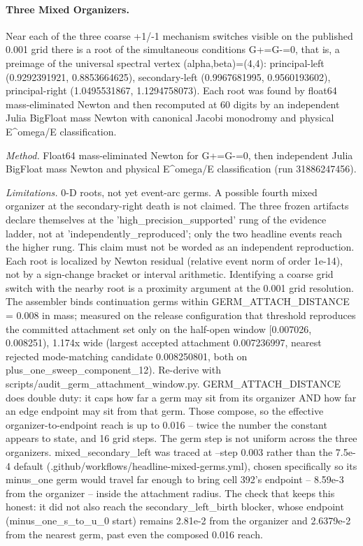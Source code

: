 \paragraph{Three Mixed Organizers.}
Near each of the three coarse +1/-1 mechanism switches visible on the published 0.001 grid there is a root of the simultaneous conditions G+=G-=0, that is, a preimage of the universal spectral vertex (alpha,beta)=(4,4): principal-left (0.9292391921, 0.8853664625), secondary-left (0.9967681995, 0.9560193602), principal-right (1.0495531867, 1.1294758073). Each root was found by float64 mass-eliminated Newton and then recomputed at 60 digits by an independent Julia BigFloat mass Newton with canonical Jacobi monodromy and physical E\^{}omega/E classification.

\emph{Method.} Float64 mass-eliminated Newton for G+=G-=0, then independent Julia BigFloat mass Newton and physical E\^{}omega/E classification (run 31886247456).

\emph{Limitations.} 0-D roots, not yet event-arc germs. A possible fourth mixed organizer at the secondary-right death is not claimed. The three frozen artifacts declare themselves at the 'high\_precision\_supported' rung of the evidence ladder, not at 'independently\_reproduced'; only the two headline events reach the higher rung. This claim must not be worded as an independent reproduction. Each root is localized by Newton residual (relative event norm of order 1e-14), not by a sign-change bracket or interval arithmetic. Identifying a coarse grid switch with the nearby root is a proximity argument at the 0.001 grid resolution. The assembler binds continuation germs within GERM\_ATTACH\_DISTANCE = 0.008 in mass; measured on the release configuration that threshold reproduces the committed attachment set only on the half-open window [0.007026, 0.008251), 1.174x wide (largest accepted attachment 0.007236997, nearest rejected mode-matching candidate 0.008250801, both on plus\_one\_sweep\_component\_12). Re-derive with scripts/audit\_germ\_attachment\_window.py. GERM\_ATTACH\_DISTANCE does double duty: it caps how far a germ may sit from its organizer AND how far an edge endpoint may sit from that germ. Those compose, so the effective organizer-to-endpoint reach is up to 0.016 -- twice the number the constant appears to state, and 16 grid steps. The germ step is not uniform across the three organizers. mixed\_secondary\_left was traced at --step 0.003 rather than the 7.5e-4 default (.github/workflows/headline-mixed-germs.yml), chosen specifically so its minus\_one germ would travel far enough to bring cell 392's endpoint -- 8.59e-3 from the organizer -- inside the attachment radius. The check that keeps this honest: it did not also reach the secondary\_left\_birth blocker, whose endpoint (minus\_one\_s\_to\_u\_0 start) remains 2.81e-2 from the organizer and 2.6379e-2 from the nearest germ, past even the composed 0.016 reach.

